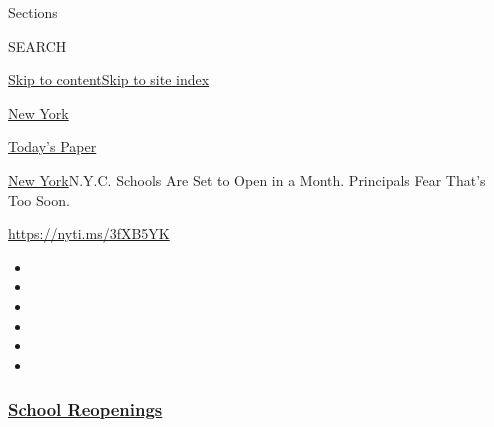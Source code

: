 Sections

SEARCH

\protect\hyperlink{site-content}{Skip to
content}\protect\hyperlink{site-index}{Skip to site index}

\href{https://www.nytimes3xbfgragh.onion/section/nyregion}{New York}

\href{https://myaccount.nytimes3xbfgragh.onion/auth/login?response_type=cookie\&client_id=vi}{}

\href{https://www.nytimes3xbfgragh.onion/section/todayspaper}{Today's
Paper}

\href{/section/nyregion}{New York}\textbar{}N.Y.C. Schools Are Set to
Open in a Month. Principals Fear That's Too Soon.

\url{https://nyti.ms/3fXB5YK}

\begin{itemize}
\item
\item
\item
\item
\item
\item
\end{itemize}

\hypertarget{school-reopenings}{%
\subsubsection{\texorpdfstring{\href{https://www.nytimes3xbfgragh.onion/spotlight/schools-reopening?name=styln-coronavirus-schools-reopening\&region=TOP_BANNER\&block=storyline_menu_recirc\&action=click\&pgtype=Article\&impression_id=ce6b7fc0-f292-11ea-8bc2-93f279d4169d\&variant=undefined}{School
Reopenings}}{School Reopenings}}\label{school-reopenings}}

